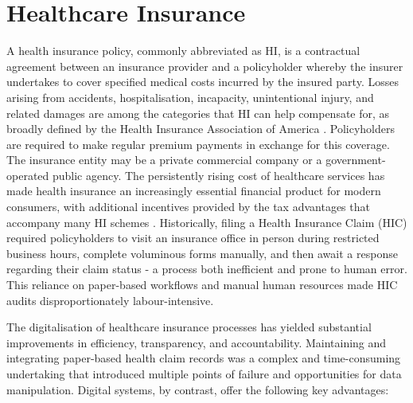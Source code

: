 \section{Healthcare Insurance}

A health insurance policy, commonly abbreviated as HI, is a contractual agreement between an insurance provider and a policyholder whereby the insurer undertakes to cover specified medical costs incurred by the insured party. Losses arising from accidents, hospitalisation, incapacity, unintentional injury, and related damages are among the categories that HI can help compensate for, as broadly defined by the Health Insurance Association of America \cite{healthinsurance2021}. Policyholders are required to make regular premium payments in exchange for this coverage. The insurance entity may be a private commercial company or a government-operated public agency. The persistently rising cost of healthcare services has made health insurance an increasingly essential financial product for modern consumers, with additional incentives provided by the tax advantages that accompany many HI schemes \cite{sheshasaayee2018}. Historically, filing a Health Insurance Claim (HIC) required policyholders to visit an insurance office in person during restricted business hours, complete voluminous forms manually, and then await a response regarding their claim status - a process both inefficient and prone to human error. This reliance on paper-based workflows and manual human resources made HIC audits disproportionately labour-intensive.

The digitalisation of healthcare insurance processes has yielded substantial improvements in efficiency, transparency, and accountability. Maintaining and integrating paper-based health claim records was a complex and time-consuming undertaking that introduced multiple points of failure and opportunities for data manipulation. Digital systems, by contrast, offer the following key advantages:

